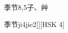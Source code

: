 \begin{entry}{季节}{8,5}{⼦、⾋}
  \begin{phonetics}{季节}{ji4jie2}[][HSK 4]
  \end{phonetics}
\end{entry}
